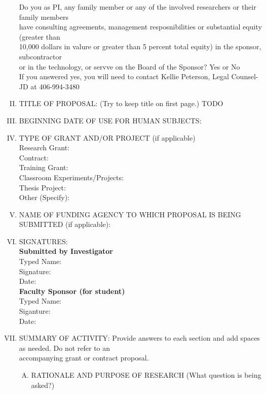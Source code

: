 \documentclass{article}
\newcommand{\response}[1]{{\color{blue}#1}}
\begin{document}
\begin{enumerate}[I.]
        \color{red}
        Do you as PI, any family member or any of the involved researchers or their family members\\
        have consulting agreements, management resposnibilities or substantial equity (greater than\\
        10,000 dollars in valure or greater than 5 percent total equity) in the sponsor, subcontractor\\
        or in the technology, or servve on the Board of the Sponsor? Yes or No\\

        If you answered yes, you will need to contact Kellie Peterson, Legal Counsel-JD at 406-994-3480
        \color{black}


    \item TITLE OF PROPOSAL:  (Try to keep title on first page.)
        \response{TODO}

    \item BEGINNING DATE OF USE FOR HUMAN SUBJECTS: 
    
    \item TYPE OF GRANT AND/OR PROJECT (if applicable)\\
    Research Grant:\\
    Contract:\\
    Training Grant:\\ 
    Classroom Experiments/Projects:\\
    Thesis Project:\\
    Other (Specify):\\
    
    \item NAME OF FUNDING AGENCY TO WHICH PROPOSAL IS BEING SUBMITTED (if applicable):
    
    \item SIGNATURES:\\
    \textbf{Submitted by Investigator}\\
    Typed Name:\\
    Signature:\\
    Date:\\
    \textbf{Faculty Sponsor (for student)}\\
    Typed Name:\\
    Siganture:\\
    Date:\\

    \item SUMMARY OF ACTIVITY: Provide answers to each section and add spaces as needed. Do not refer to an \\
    accompanying grant or contract proposal. 
    \begin{enumerate}[A.]
        \item RATIONALE AND PURPOSE OF RESEARCH (What question is being asked?)
        

\end{enumerate}
\end{enumerate}
\end{document}
